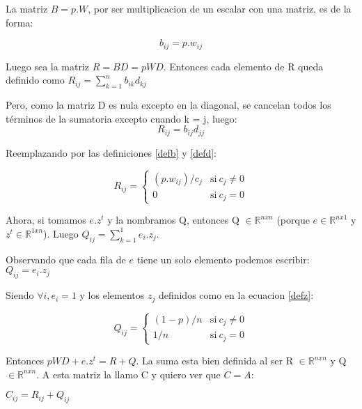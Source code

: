 La matriz $B = p.W$, por ser multiplicacion de un escalar con una matriz, es de la forma:

\begin{equation}
	\label{defb}
	b_{ij} = p.w_{ij}
\end{equation}

Luego sea la matriz $R = BD = pWD$. Entonces cada elemento de R queda definido como $R_{ij} = \sum_{k=1}^n b_{ik} d_{kj}$

Pero, como la matriz D es nula excepto en la diagonal, se cancelan todos los términos de la sumatoria excepto cuando k = j, luego: 
\begin{equation}
R_{ij} = b_{ij} d_{jj}
\end{equation}

Reemplazando por las definiciones \ref{defb} y \ref{defd}: 

\begin{equation}
	\label{defr}
    R_{ij} = \left\{
            \begin{array}{ll}
                 (p.w_{ij})/c_j & \mathrm{si\ } c_j \neq 0 \\
                 0              & \mathrm{si\ } c_j = 0
            \end{array}
        \right.
\end{equation}

Ahora, si tomamos $e.z^t$ y la nombramos Q, entonces Q $\in \mathbb{R}^{nxn}$ (porque $e \in \mathbb{R}^{nx1}$ y $z^t \in \mathbb{R}^{1xn}$). Luego $Q_{ij} = \sum_{k=1}^1e_i.z_j$.

Observando que cada fila de $e$ tiene un solo elemento podemos escribir:  
$Q_{ij} = e_i.z_j$

Siendo $\forall i, e_i = 1$ y los elementos $z_j$ definidos como en la ecuacion \ref{defz}:

\begin{equation}
	\label{defq}
    Q_{ij} = \left\{
            \begin{array}{ll}
                 (1-p)/n      & \mathrm{si\ } c_j \neq 0 \\
                 1/n & \mathrm{si\ } c_j = 0
            \end{array}
        \right.
\end{equation}

Entonces $pWD + e.z^t = R + Q$. La suma esta bien definida al ser R $\in \mathbb{R}^{nxn}$ y Q $\in \mathbb{R}^{nxn}$. A esta matriz la llamo C y quiero ver que $C=A$:

$C_{ij} = R_{ij} + Q_{ij}$

